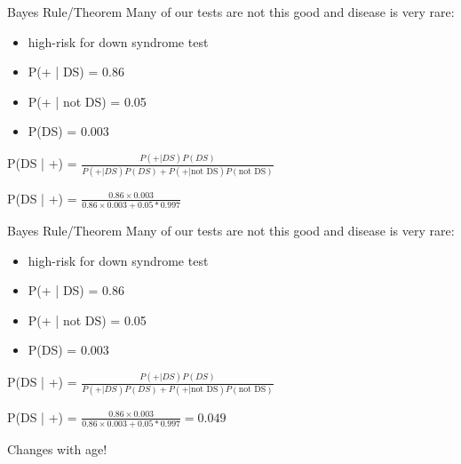 \documentclass[presentation]{beamer}
\begin{document}
\begin{frame}[label={sec:org1cdda7a}]{Bayes Rule/Theorem}
Many of our tests are not this good and disease is very rare:

\begin{itemize}
\item high-risk for down syndrome test
\item P(+ | DS) = 0.86
\item P(+ | not DS) = 0.05
\item P(DS) = 0.003
\end{itemize}


\pause

P(DS | +) =  \(\frac{P( + | DS) P(DS)}{P( + | DS)P(DS) + P( + | \text{not DS})P(\text{not DS})}\)

\pause

P(DS | +) =  \(\frac{0.86 \times 0.003}{0.86 \times 0.003 + 0.05*0.997}\)
\end{frame}


\begin{frame}[label={sec:org15ef8d3}]{Bayes Rule/Theorem}
Many of our tests are not this good and disease is very rare:

\begin{itemize}
\item high-risk for down syndrome test
\item P(+ | DS) = 0.86
\item P(+ | not DS) = 0.05
\item P(DS) = 0.003
\end{itemize}


\pause

P(DS | +) =  \(\frac{P( + | DS) P(DS)}{P( + | DS)P(DS) + P( + | \text{not DS})P(\text{not DS})}\)

\pause

P(DS | +) =  \(\frac{0.86 \times 0.003}{0.86 \times 0.003 + 0.05*0.997} = 0.049\)

Changes with age!
\end{frame}
\end{document}
